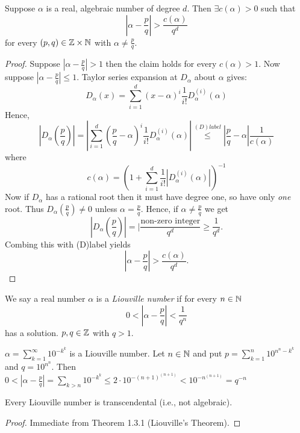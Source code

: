 \documentclass[NumTh.tex]{subfiles}
\begin{document}
\begin{theorem}\label{1_3_1}
  Suppose $\alpha$ is a real, algebraic number of degree $d$.
  Then $\exists c(\alpha) > 0$ such that
  \[ |\alpha - \frac{p}{q}| > \frac{c(\alpha)}{q^d} \]
  for every $(p,q) \in \mathbb{Z} \times \mathbb{N}$ with $\alpha \neq \frac{p}{q}$.
\end{theorem}

\begin{proof}
  Suppose $|\alpha - \frac{p}{q} | > 1$ then the claim holds for every $c(\alpha) > 1$.
  Now suppose $|\alpha - \frac{p}{q}| \leq 1$. Taylor series expansion at $D_\alpha$ about $\alpha$ gives:
  \[ D_\alpha(x) = \sum_{i=1}^d (x - \alpha)^i \frac{1}{i!} D_\alpha^{(i)}(\alpha) \]
  Hence, 
  \[ |D_\alpha\left(\frac{p}{q}\right) | = | \sum_{i=1}^d \left(\frac{p}{q} - \alpha \right)^i \frac{1}{i!} D_\alpha^{(i)}(\alpha)| \overset{(D)label}{\leq} |\frac{p}{q} - \alpha | \frac{1}{c(\alpha)} \]
  where
  \[ c(\alpha) = \left( 1 + \sum_{i=1}^d \frac{1}{i!} |D_\alpha^{(i)}(\alpha) |\right)^{-1} \]
  Now if $D_\alpha$ has a rational root then it must have degree one, so have only \emph{one} root.
  Thus $D_\alpha \left(\frac{p}{q}\right) \neq 0$ unless $\alpha = \frac{p}{q}$.
  Hence, if $\alpha \neq \frac{p}{q}$ we get
  \[ | D_\alpha \left(\frac{p}{q}\right) | = | \frac{\text{non-zero integer}}{q^d} \geq \frac{1}{q^d}. \]
  Combing this with (D)label yields 
  \[ |\alpha - \frac{p}{q} | > \frac{c(\alpha)}{q^d}.\]
\end{proof}

We say a real number $\alpha$ is a \emph{Liouville number} if for every $n \in \mathbb{N}$
\[ 0 < |\alpha - \frac{p}{q}| < \frac{1}{q^n} \]
has a solution. $p,q \in \mathbb{Z}$ with $q > 1$.

\begin{ex}
  $\alpha = \sum_{k = 1}^\infty 10^{-k^k}$ is a Liouville number.
  Let $n \in\mathbb{N}$ and put $p = \sum_{k=1}^n 10^{n^n - k^k}$ and $q = 10^{n^n}$.
  Then $ 0 < |\alpha - \frac{p}{q}| = \sum_{k>n} 10^{-k^k} \leq 2\cdot 10^{-(n+1)^{(n+1)}} < 10^{-n^{(n+1)}} = q^{-n}$
\end{ex}

\begin{cor}\label{1_3_2}
  Every Liouville number is transcendental (i.e., not algebraic).
\end{cor}

\begin{proof}
  Immediate from Theorem 1.3.1 (Liouville's Theorem).
\end{proof}
\end{document}
